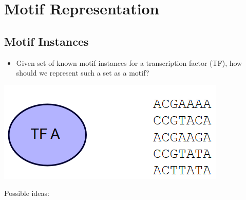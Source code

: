 \documentclass[10pt]{article}
\begin{document}
\section*{Motif Representation}
\subsection*{Motif Instances}
\begin{itemize}
	\item Given set of known motif instances for a transcription factor (TF), how should we represent such a set as a motif?
\end{itemize}
\begin{center} 
	\includegraphics*[scale=0.7]{W7_4.png} 
\end{center}
Possible ideas:
\end{document}

